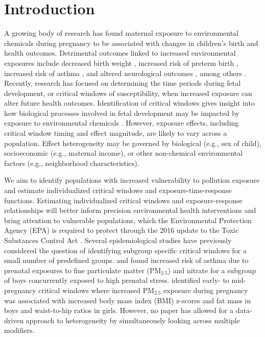 \documentclass[12pt]{article}
\begin{document}
\section{Introduction}\label{sec:intro}
A growing body of research has found maternal exposure to environmental chemicals during pregnancy to be associated with changes in children’s birth and health outcomes. Detrimental outcomes linked to increased environmental exposures include decreased birth weight \citep{Bell2007AmbientMassachusetts}, increased risk of preterm birth \citep{Stieb2012}, increased risk of asthma \citep{Lee2017,Bose2017PrenatalSex}, and altered neurological outcomes \citep{Chiu2016PrenatalAssociations}, among others \citep{Sram2005AmbientLiterature}. Recently, research has focused on determining the time periods during fetal development, or critical windows of susceptibility, when increased exposure can alter future health outcomes. Identification of critical windows gives insight into how biological processes involved in fetal development may be impacted by exposure to environmental chemicals \citep{Wright2017EnvironmentHealth}. However, exposure effects, including critical window timing and effect magnitude, are likely to vary across a population. Effect heterogeneity may be governed by biological (e.g., sex of child), socioeconomic (e.g., maternal income), or other non-chemical environmental factors (e.g., neighborhood characteristics). 

We aim to identify populations with increased vulnerability to pollution exposure and estimate individualized critical windows and exposure-time-response functions. Estimating individualized critical windows and exposure-response relationships will better inform precision environmental health interventions and bring attention to vulnerable populations, which the Environmental Protection Agency (EPA) is required to protect through the 2016 update to the Toxic Substances Control Act \citep{Krimsky2017TheAct}. Several epidemiological studies have previously considered the question of identifying subgroup specific critical windows for a small number of predefined groups. \citet{Lee2017} and \citet{Bose2017PrenatalSex} found increased risk of asthma due to prenatal exposures to fine particulate matter (PM$_{2.5}$) and nitrate for a subgroup of boys concurrently exposed to high prenatal stress. \citet{Chiu2017PrenatalAssociations} identified early- to mid-pregnancy critical windows where increased PM$_{2.5}$ exposure during pregnancy was associated with increased body mass index (BMI) z-scores and fat mass in boys and waist-to-hip ratios in girls. However, no paper has allowed for a data-driven approach to heterogeneity by simultaneously looking across multiple modifiers. 
\end{document}
